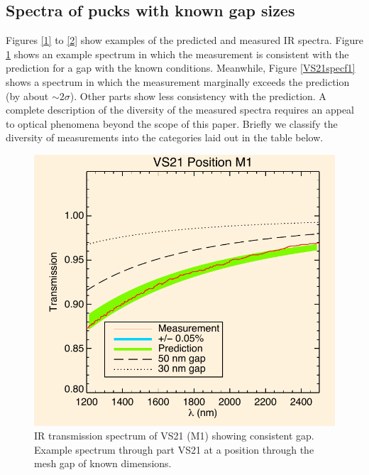 \documentclass[osajnl,preprint,showpacs,superscriptaddress,12pt]{revtex4-1} %
\begin{document}
\subsection{Spectra of pucks with known gap sizes}
Figures \ref{1} to \ref{2} show examples of the predicted and measured IR spectra.  Figure \ref{VS21specm1} shows an example spectrum in which the measurement is consistent with the prediction for a gap with the known conditions.  Meanwhile, Figure \ref{VS21specf1} shows a spectrum in which the measurement marginally exceeds the prediction (by about $\sim 2 \sigma$).  Other parts show less consistency with the prediction.  A complete description of the diversity of the measured spectra requires an appeal to optical phenomena beyond the scope of this paper.  Briefly we classify the diversity of measurements into the categories laid out in the table below.  

\begin{figure}[htbp]
\centerline{\includegraphics[width=.8\columnwidth]{figs/20130911_VS21posM1}}
\caption{IR transmission spectrum of VS21 (M1) showing consistent gap\label{VS21specm1}.  Example spectrum through part VS21 at a position through the mesh gap of known dimensions.}
\end{figure}
\end{document}
